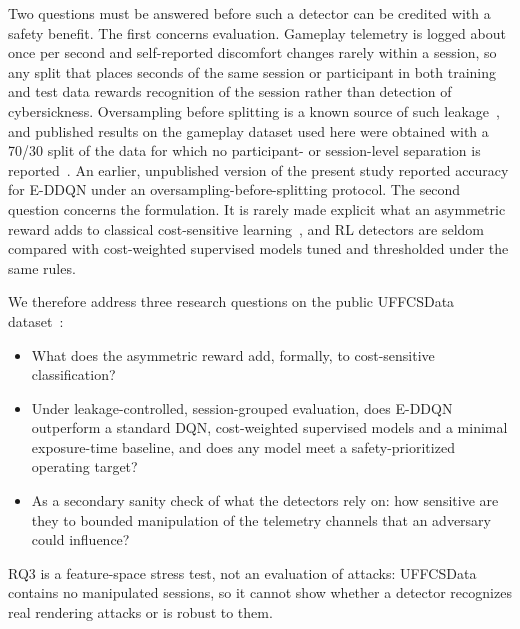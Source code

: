 Two questions must be answered before such a detector can be credited with a safety benefit. The first concerns evaluation. Gameplay telemetry is logged about once per second and self-reported discomfort changes rarely within a session, so any split that places seconds of the same session or participant in both training and test data rewards recognition of the session rather than detection of cybersickness. Oversampling before splitting is a known source of such leakage~\cite{kapoor2023leakage}, and published results on the gameplay dataset used here were obtained with a 70/30 split of the data for which no participant- or session-level separation is reported~\cite{kundu2022truvr}. An earlier, unpublished version of the present study reported  accuracy for E-DDQN under an oversampling-before-splitting protocol. The second question concerns the formulation. It is rarely made explicit what an asymmetric reward adds to classical cost-sensitive learning~\cite{elkan2001cost}, and RL detectors are seldom compared with cost-weighted supervised models tuned and thresholded under the same rules.

We therefore address three research questions on the public UFFCSData dataset~\cite{porcino2019uffcsdata}:
\begin{itemize}
\item[RQ1] What does the asymmetric reward add, formally, to cost-sensitive classification?
\item[RQ2] Under leakage-controlled, session-grouped evaluation, does E-DDQN outperform a standard DQN, cost-weighted supervised models and a minimal exposure-time baseline, and does any model meet a safety-prioritized operating target?
\item[RQ3] As a secondary sanity check of what the detectors rely on: how sensitive are they to bounded manipulation of the telemetry channels that an adversary could influence?
\end{itemize}
RQ3 is a feature-space stress test, not an evaluation of attacks: UFFCSData contains no manipulated sessions, so it cannot show whether a detector recognizes real rendering attacks or is robust to them.


